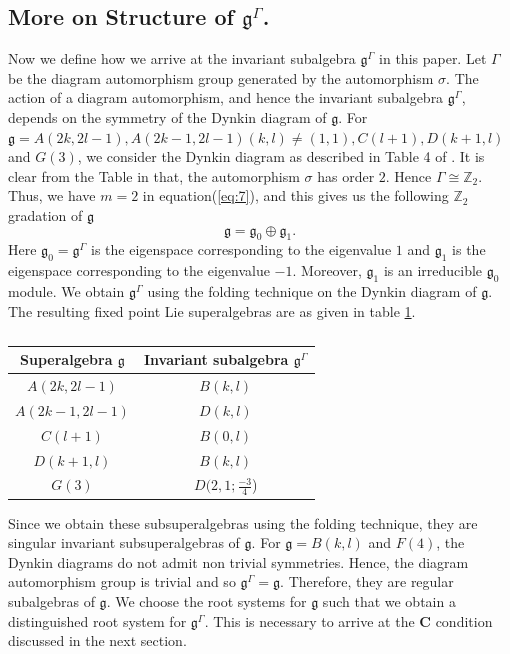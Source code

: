 \documentclass[11pt]{amsart}
\theoremstyle{plain}
\theoremstyle{definition}
\newcommand{\g}{\mathfrak{g}}
\begin{document}
\subsection{More on Structure of $\g^{\Gamma}$.}
Now we define how we arrive at the invariant subalgebra $\g^{\Gamma}$ in this paper. Let $\Gamma$ be the diagram automorphism group generated by the automorphism $\sigma$. The action of a diagram automorphism, and hence the invariant subalgebra $\g^{\Gamma}$, depends on the symmetry of the Dynkin diagram of $\g$. For $\g= A(2k,2l-1), A(2k-1,2l-1)(k,l)\neq(1,1), C(l+1), D(k+1,l)$ and $G(3)$, we consider the Dynkin diagram as described in Table 4 of  \cite{vdL}. It is clear from the Table in \cite{vdL} that, the automorphism $\sigma$ has order $2$. Hence $\Gamma\cong\mathbb{Z}_{2}$. Thus, we have $m=2$ in equation(\ref{eq:7}), and this gives us the following $\mathbb{Z}_{2}$ gradation of $\g$ 
\begin{equation*}
    \g=\g_{0}\oplus\g_{1}.
\end{equation*}
Here $\g_{0}=\g^{\Gamma}$ is the eigenspace corresponding to the eigenvalue $1$ and $\g_{1}$ is the eigenspace corresponding to the eigenvalue $-1$. Moreover, $\g_{1}$ is an irreducible $\g_{0}$ module. We obtain $\g^{\Gamma}$ using the folding technique on the Dynkin diagram of $\g$. The resulting fixed point Lie superalgebras are as given in table \ref{tab:1}.
\begin{table}[ht]
    \centering
    \begin{tabular}{|c|c|}
          \hline
    Superalgebra $\g$ & Invariant subalgebra $\g^{\Gamma}$\\   
    \hline
        $A(2k, 2l-1)$ & $B(k,l)$  \\
        $A(2k-1, 2l-1)$ & $D(k,l)$\\
        $C(l+1)$ & $B(0,l)$\\
        $D(k+1,l)$ & $B(k,l)$\\
        $G(3)$ & $D(2,1;\frac{-3}{4}$)\\
    \hline
    \end{tabular}
    \caption{}
    \label{tab:1}
\end{table}

Since we obtain these subsuperalgebras using the folding technique, they are singular invariant subsuperalgebras of $\g$. For $\g=B(k,l)$ and $F(4)$, the Dynkin diagrams do not admit non trivial symmetries. Hence, the diagram automorphism group is trivial and so $\g^{\Gamma}=\g$. Therefore, they are regular subalgebras of $\g$. We choose the root systems for $\g$ such that we obtain a distinguished root system for $\g^{\Gamma}$. This is necessary to arrive at the $\mathbf{C}$ condition discussed in the next section.
\end{document}
